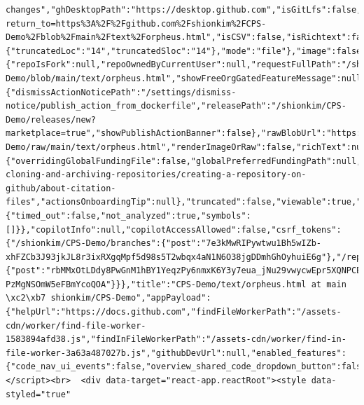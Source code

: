 \documentclass[
  letterpaper,
]{book}
\begin{document}
\begin{verbatim}
changes","ghDesktopPath":"https://desktop.github.com","isGitLfs":false,"onBranch":true,"shortPath":"ac166f6","siteNavLoginPath":"/login?return_to=https%3A%2F%2Fgithub.com%2Fshionkim%2FCPS-Demo%2Fblob%2Fmain%2Ftext%2Forpheus.html","isCSV":false,"isRichtext":false,"toc":null,"lineInfo":{"truncatedLoc":"14","truncatedSloc":"14"},"mode":"file"},"image":false,"isCodeownersFile":null,"isPlain":false,"isValidLegacyIssueTemplate":false,"issueTemplate":null,"discussionTemplate":null,"language":"HTML","languageID":146,"large":false,"planSupportInfo":{"repoIsFork":null,"repoOwnedByCurrentUser":null,"requestFullPath":"/shionkim/CPS-Demo/blob/main/text/orpheus.html","showFreeOrgGatedFeatureMessage":null,"showPlanSupportBanner":null,"upgradeDataAttributes":null,"upgradePath":null},"publishBannersInfo":{"dismissActionNoticePath":"/settings/dismiss-notice/publish_action_from_dockerfile","releasePath":"/shionkim/CPS-Demo/releases/new?marketplace=true","showPublishActionBanner":false},"rawBlobUrl":"https://github.com/shionkim/CPS-Demo/raw/main/text/orpheus.html","renderImageOrRaw":false,"richText":null,"renderedFileInfo":null,"shortPath":null,"symbolsEnabled":true,"tabSize":8,"topBannersInfo":{"overridingGlobalFundingFile":false,"globalPreferredFundingPath":null,"showInvalidCitationWarning":false,"citationHelpUrl":"https://docs.github.com/github/creating-cloning-and-archiving-repositories/creating-a-repository-on-github/about-citation-files","actionsOnboardingTip":null},"truncated":false,"viewable":true,"workflowRedirectUrl":null,"symbols":{"timed_out":false,"not_analyzed":true,"symbols":[]}},"copilotInfo":null,"copilotAccessAllowed":false,"csrf_tokens":{"/shionkim/CPS-Demo/branches":{"post":"7e3kMwRIPywtwu1Bh5wIZb-xhFZCb3J93jkJL8r3ixRXgqMpf5d98s5T2wbqx4aN1N6O38jgDDmhGhOyhuiE6g"},"/repos/preferences":{"post":"rbMMxOtLDdy8PwGnM1hBY1YeqzPy6nmxK6Y3y7eua_jNu29vwycwEpr5XQNPCE6cL-PzMgNSOmW5eFBmYcoQOA"}}},"title":"CPS-Demo/text/orpheus.html at main \xc2\xb7 shionkim/CPS-Demo","appPayload":{"helpUrl":"https://docs.github.com","findFileWorkerPath":"/assets-cdn/worker/find-file-worker-1583894afd38.js","findInFileWorkerPath":"/assets-cdn/worker/find-in-file-worker-3a63a487027b.js","githubDevUrl":null,"enabled_features":{"code_nav_ui_events":false,"overview_shared_code_dropdown_button":false,"react_blob_overlay":false,"copilot_conversational_ux_embedding_update":false,"copilot_smell_icebreaker_ux":true,"copilot_workspace":false}}}</script><br>  <div data-target="react-app.reactRoot"><style data-styled="true" 
\end{verbatim}
\end{document}
